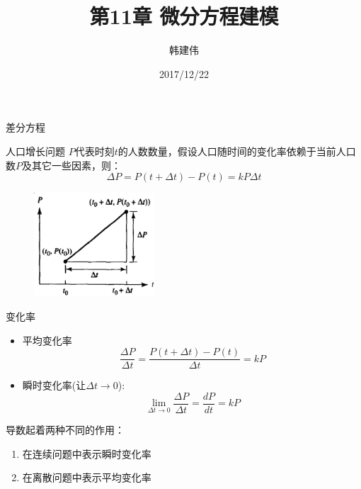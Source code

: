 \documentclass[UTF8]{ctexbeamer}
\title{第11章 微分方程建模}
\author{韩建伟}
\institute{
  信息学院\\
  \texttt{hanjianwei@zjgsu.edu.cn}
}
\date{2017/12/22}
\begin{document}
\begin{frame}[plain]
  \titlepage{}
\end{frame}

\begin{frame}{差分方程}
  
  \begin{block}{人口增长问题}
    $P$代表时刻$t$的人数数量，假设人口随时间的变化率依赖于当前人口数$P$及其它一些因素，则：
    \[
    \Delta P = P(t+\Delta t) - P(t) = kP\Delta t
    \]
  \end{block}

  \begin{figure}
    \centering
    \includegraphics[width=0.4\textwidth]{diff.png}
  \end{figure}
  
\end{frame}

\begin{frame}{变化率}
  \begin{itemize}
  \item 平均变化率
    \[
    \frac{\Delta P}{\Delta t} = \frac{P(t+\Delta t) - P(t)}{\Delta t} = kP
    \]
  \item 瞬时变化率(让$\Delta t \rightarrow 0$):
    \[
    \lim_{\Delta t \rightarrow 0} \frac{\Delta P}{\Delta t} =\frac{d P}{d t} =kP
    \]
  \end{itemize}

  导数起着两种不同的作用：

  \begin{enumerate}
  \item 在连续问题中表示瞬时变化率
  \item 在离散问题中表示平均变化率
  \end{enumerate}

\end{frame}
\end{document}
